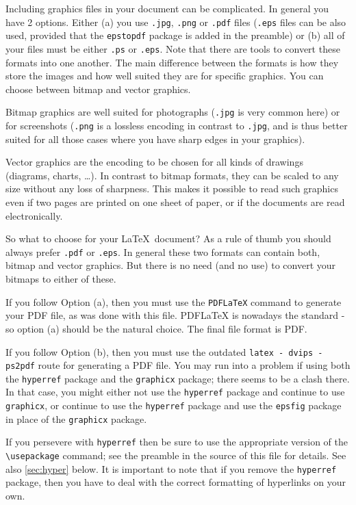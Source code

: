 \documentclass{scspaperproc}
\theoremstyle{scsthe}
\begin{document}
Including graphics files in your document can be complicated. In general you have 2 options. Either (a) you use \texttt{.jpg}, \texttt{.png} or \texttt{.pdf} files (\texttt{.eps} files can be also used, provided that the \texttt{epstopdf} package is added in the preamble) or (b) all of your files must be either \texttt{.ps} or \texttt{.eps}.
Note that there are tools to convert these formats into one another. The main difference between the formats is how they store the images and how well suited they are for specific graphics. You can choose between bitmap and vector graphics.

Bitmap graphics are well suited for photographs (\texttt{.jpg} is very common here) or for screenshots (\texttt{.png} is a lossless encoding in contrast to \texttt{.jpg}, and is thus better suited for all those cases where you have sharp edges in your graphics).

Vector graphics are the encoding to be chosen for all kinds of drawings (diagrams, charts, \ldots). In contrast to bitmap formats, they can be scaled to any size without any loss of sharpness. This makes it possible to read such graphics even if two pages are printed on one sheet of paper, or if the documents are read electronically.

So what to choose for your \LaTeX\ document? As a rule of thumb you should always prefer \texttt{.pdf} or \texttt{.eps}.
In general these two formats can contain both, bitmap and vector graphics. But there is no need (and no use) to convert your bitmaps to either of these.

If you follow Option (a), then you must use the \texttt{PDFLaTeX} command to generate your PDF file, as was done with this file. PDFLaTeX is nowadays the standard - so option (a) should be the natural choice. The final file format is PDF.

If you follow Option (b), then you must use the outdated \texttt{latex - dvips - ps2pdf} route for generating a PDF file. You may run into a problem if using both the \texttt{hyperref} package and the \texttt{graphicx} package; there seems to be a clash there.
In that case, you might either not use the \texttt{hyperref} package and continue to use \texttt{graphicx}, or continue to use the \texttt{hyperref} package and use the \texttt{epsfig} package in place of the \texttt{graphicx} package.

If you persevere with \texttt{hyperref} then be sure to use the appropriate version of the \verb+\usepackage+ command; see the preamble in the source of this file for details. See also \autoref{sec:hyper} below. It is important to note that if you remove the \texttt{hyperref} package, then you have to deal with the correct formatting of hyperlinks on your own.
\end{document}
